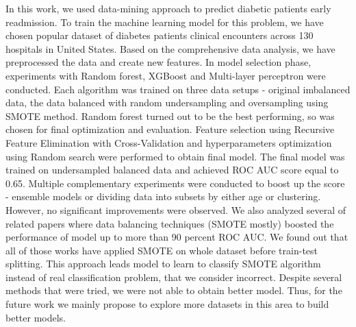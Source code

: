 \documentclass[runningheads]{llncs}
\begin{document}
In this work, we used data-mining approach to predict diabetic patients early readmission. To train the machine learning model for this problem, we have chosen popular dataset of diabetes patients clinical encounters across 130 hospitals in United States. Based on the comprehensive data analysis, we have preprocessed the data and create new features. In model selection phase, experiments with Random forest, XGBoost and Multi-layer perceptron were conducted. Each algorithm was trained on three data setups - original imbalanced data, the data balanced with random undersampling and oversampling using SMOTE method. Random forest turned out to be the best performing, so was chosen for final optimization and evaluation. Feature selection using Recursive Feature Elimination with Cross-Validation and hyperparameters optimization using Random search were performed to obtain final model. The final model was trained on undersampled balanced data and achieved ROC AUC score equal to 0.65. Multiple complementary experiments were conducted to boost up the score - ensemble models or dividing data into subsets by either age or clustering. However, no significant improvements were observed. We also analyzed several of related papers where data balancing techniques (SMOTE mostly) boosted the performance of model up to more than 90 percent ROC AUC. We found out that all of those works have applied SMOTE on whole dataset before train-test splitting. This approach leads model to learn to classify SMOTE algorithm instead of real classification problem, that we consider incorrect. Despite several methods that were tried, we were not able to obtain better model. Thus, for the future work we mainly propose to explore more datasets in this area to build better models.


%


\end{document}
